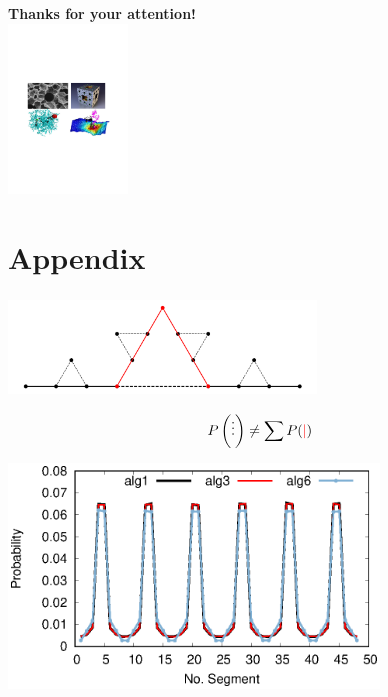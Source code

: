 \documentclass[9pt]{beamer}
\newcommand{\llp}{\left(}
\newcommand{\rrp}{\right)}
\begin{document}
\section{}
\begin{frame}[noframenumbering]
\thispagestyle{empty}
	\begin{center}
	\textbf{\Huge{Thanks for your attention!}} \\[6ex]
	  \includegraphics[height=4.5cm]{figs/PhD_project_final_figs.pdf}
	\end{center}
\end{frame}












\section{Appendix}
\begin{frame}[noframenumbering]
	\frametitle{}

	\begin{minipage}{0.65\linewidth}
		\includegraphics[height=2.5cm]{figs/no_ana.png}
	\end{minipage}
	\begin{minipage}{0.33\linewidth}
		\Huge $$ P \llp \vdots \rrp \neq \sum P(\textcolor{red}{|}) $$
	\end{minipage}
	\begin{center}
    	\includegraphics[height=6cm]{figs/pbb_g2_EDIPP.eps}
	\end{center}
\end{frame}
\end{document}
